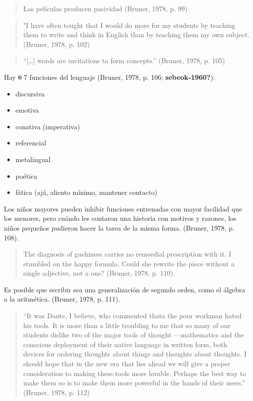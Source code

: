 \documentclass[
  12,
]{scrartcl}
\providecommand{\tightlist}{%
  \setlength{\itemsep}{0pt}\setlength{\parskip}{0pt}}
\begin{document}
\begin{quote}
Las películas producen pasividad (Bruner, 1978, p. 99)
\end{quote}

\begin{quote}
"I have often tought that I would do more for my students by teaching
them to write and think in English than by teaching them my own subject.
(Bruner, 1978, p. 102)
\end{quote}

\begin{quote}
``{[}\ldots{]} words are invitations to form concepts.'' (Bruner, 1978,
p. 105)
\end{quote}

Hay \sout{6} 7 funciones del lenguaje (Bruner, 1978, p. 106;
\textbf{sebeok-1960?}):

\begin{itemize}
\tightlist
\item
  discursiva
\item
  emotiva
\item
  conativa (imperativa)
\item
  referencial
\item
  metalingual
\item
  poética
\item
  fática (ajá, aliento mínimo, mantener contacto)
\end{itemize}

Los niños mayores pueden inhibir funciones entrenadas con mayor
facilidad que los menores, pero cuándo les contaron una historia con
motivos y razones, los niños pequeños pudieron hacer la tarea de la
misma forma. (Bruner, 1978, p. 108).

\begin{quote}
The diagnosis of gushiness carries no remeedial prescription with it. I
stumbled on the happy formula. Could she rewrite the piece without a
single adjective, not a one? (Bruner, 1978, p. 110).
\end{quote}

Es posible que escribir sea una generalización de segundo orden, como el
álgebra a la aritmética. (Bruner, 1978, p. 111).

\begin{quote}
``It was Dante, I believe, who commented thata the poor workman hated
his tools. It is more than a little troubling to me that so many of our
students dislike two of the major tools of thought ---mathematics and
the conscious deployment of their native language in written form, both
devices for ordering thoughts about things and thoughts about thoughts.
I should hope that in the new era that lies ahead we will give a proper
consideration to making these tools more lovable. Perhaps the best way
to make them so is to make them more powerful in the hands of their
users.'' (Bruner, 1978, p. 112)
\end{quote}
\end{document}
